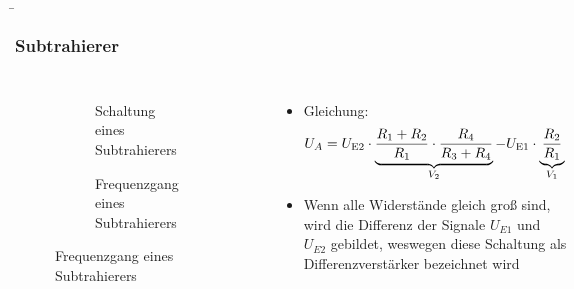 \begin{frame}
    \b{
        \frametitle{Subtrahierer}
        \begin{columns}
            \centering
            \begin{figure}
                \centering
                \begin{subfigure}{\linewidth}
                    \centering
                    \scalebox{1}{}
                    \caption{Schaltung eines Subtrahierers}
                \end{subfigure}
                \begin{subfigure}{\linewidth}
                    \centering
                    \scalebox{0.7}{}
                    \caption{Frequenzgang eines Subtrahierers}
                \end{subfigure}
            \end{figure}

            \raggedleft
            \begin{itemize}
                \item Gleichung:
                      \[
                          {U_A} = {U_{{\textnormal{E2}}}} \cdot \underbrace{ \frac{R_1 + R_2}{R_1} \cdot \frac{R_4}{R_3 + R_4}}_{V_2} - U_{\textnormal{E1}} \cdot \underbrace{\frac{R_2}{R_1}}_{V_1}
                      \]
                \item Wenn alle Widerstände gleich groß sind, wird die Differenz der Signale $U_{E1}$ und $U_{E2}$ gebildet, weswegen diese Schaltung als Differenzverstärker bezeichnet wird
            \end{itemize}
        \end{columns}
    }
\end{frame}



